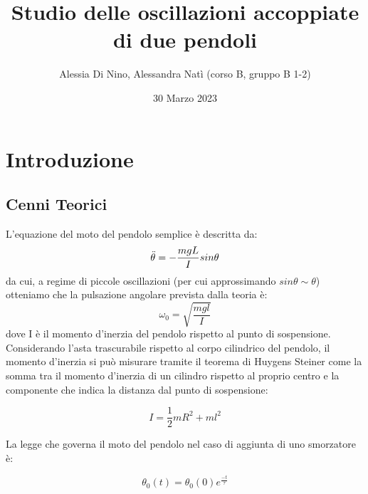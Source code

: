 \documentclass{article}
\begin{document}
\title{Studio delle oscillazioni accoppiate di due pendoli}
\author{Alessia Di Nino, Alessandra Natì (corso B, gruppo B 1-2)}
\date{30 Marzo 2023}
\maketitle

\section{Introduzione}
\subsection{Cenni Teorici}
L'equazione del moto del pendolo semplice è descritta da:
\begin{equation}
    \Ddot{\theta} = -\frac{mgL}{I} sin \theta
\end{equation}
da cui, a regime di piccole oscillazioni (per cui approssimando $sin \theta \sim \theta$) otteniamo che la pulsazione angolare prevista dalla teoria è:
\begin{equation}
    \omega_0 = \sqrt{\frac{mgl}{I}}
    \label{omega}
\end{equation}
dove I è il momento d'inerzia del pendolo rispetto al punto di sospensione. Considerando l'asta trascurabile rispetto al corpo cilindrico del pendolo, il momento d'inerzia si può misurare tramite il teorema di Huygens Steiner come la somma tra il momento d'inerzia di un cilindro rispetto al proprio centro e la componente che indica la distanza dal punto di sospensione:

\begin{equation}
    I = \frac{1}{2}mR^2 + ml^2
\end{equation}

La legge che governa il moto del pendolo nel caso di aggiunta di uno smorzatore è:

\begin{equation}
    \theta_0(t) = \theta_0(0)e^{\frac{-t}{\tau}}
\end{equation}
\end{document}
